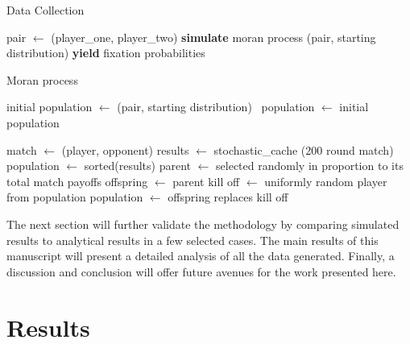 \documentclass[10pt,letterpaper]{article}
\begin{document}
\begin{algorithm}[!hbtp]
        \caption{Data Collection}
        \label{alg:data_collection}
          \begin{algorithmic}[1]
                \STATE pair $\gets$ (player\_one, player\_two)
                \STATE \textbf{simulate} moran process (pair, starting distribution)
                \ENDWHILE
                \STATE\textbf{yield} fixation probabilities
                \ENDFOR
              \ENDFOR
            \ENDFOR
          \end{algorithmic}
\end{algorithm}

\begin{algorithm}[!hbtp]
        \caption{Moran process}
        \label{alg:moran_process}
          \begin{algorithmic}[1]
          \STATE initial population $\gets$ (pair, starting distribution) \
          \STATE population $\gets$ initial population

                \STATE match $\gets$ (player, opponent)
                \STATE results $\gets$ stochastic\_cache (200 round match)
                \ENDFOR
              \ENDFOR
              \STATE population $\gets$ sorted(results)
              \STATE parent $\gets$ selected randomly in proportion to its total match payoffs
              \STATE offspring $\gets$ parent
              \STATE kill off $\gets$ uniformly random player from population
              \STATE population $\gets$ offspring replaces kill off
            \ENDWHILE
          \end{algorithmic}
\end{algorithm}

The next section will further validate the methodology by comparing
simulated results to analytical results in a few selected cases. The main
results of this
manuscript will
present a detailed analysis of all the data generated. Finally,
a discussion and conclusion will offer future avenues for the work
presented here.

\section*{Results}
\end{document}
